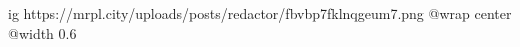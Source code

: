  
 
 
 
 

\ifcmt
  ig https://mrpl.city/uploads/posts/redactor/fbvbp7fklnqgeum7.png
  @wrap center
  @width 0.6
\fi

